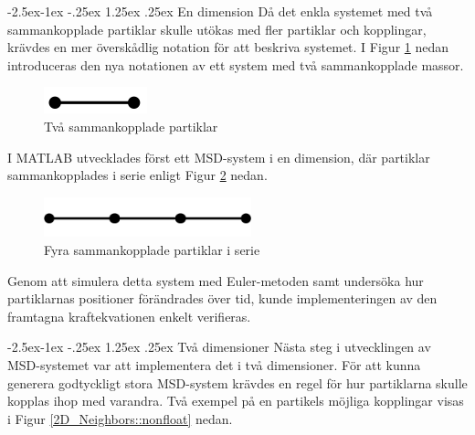 \documentclass[a4paper,12pt,oneside,final,swedish]{extarticle}
\makeatletter
\renewcommand\paragraph{\@startsection{paragraph}{4}{\z@}%
            {-2.5ex\@plus -1ex \@minus -.25ex}%
            {1.25ex \@plus .25ex}%
            {\normalfont\normalsize\bfseries}}
\makeatother
\begin{document}
\paragraph{En dimension}
Då det enkla systemet med två sammankopplade partiklar skulle utökas med fler partiklar och kopplingar, krävdes en mer överskådlig notation för att beskriva systemet. 
I Figur \ref{2D_simple::nonfloat} nedan introduceras den nya notationen av ett system med två sammankopplade massor.

\begin{figure}[h!]
  \begin{center}
    \includegraphics[width=3cm]{Bilder/2D_simple.png} 
  \end{center}
  \caption{Två sammankopplade partiklar}
  \label{2D_simple::nonfloat}
\end{figure}
\noindent I MATLAB utvecklades först ett MSD-system i en dimension, där partiklar sammankopplades i serie enligt Figur \ref{simple1D4::nonfloat} nedan.
\begin{figure}[h!]
  \begin{center}
    \includegraphics[width=6cm]{Bilder/simple1D4.png} 
  \end{center}
  \caption{Fyra sammankopplade partiklar i serie}
  \label{simple1D4::nonfloat}
\end{figure}

Genom att simulera detta system med Euler-metoden samt undersöka hur partiklarnas positioner förändrades över tid, kunde implementeringen av den framtagna kraftekvationen enkelt verifieras.

\paragraph{Två dimensioner}
Nästa steg i utvecklingen av MSD-systemet var att implementera det i två dimensioner. För att kunna generera godtyckligt stora MSD-system krävdes en regel för hur partiklarna skulle kopplas ihop med varandra. Två exempel på en partikels möjliga kopplingar visas i Figur \ref{2D_Neighbors::nonfloat} nedan.
\end{document}
